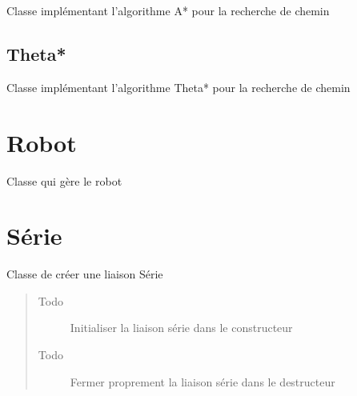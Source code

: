 \documentclass[letterpaper,10pt,french]{sphinxmanual}
\begin{document}
\begin{fulllineitems}
\label{recherche_chemin:lib.recherche_chemin.astar.Astar}
Classe implémentant l'algorithme A* pour la recherche de chemin

\end{fulllineitems}



\section{Theta*}
\label{recherche_chemin:theta}\label{recherche_chemin:module-lib.recherche_chemin.thetastar}

\begin{fulllineitems}
\label{recherche_chemin:lib.recherche_chemin.thetastar.Thetastar}
Classe implémentant l'algorithme Theta* pour la recherche de chemin

\end{fulllineitems}



\chapter{Robot}
\label{robot:module-lib.robot}\label{robot::doc}\label{robot:robot}

\begin{fulllineitems}
\label{robot:lib.robot.Robot}
Classe qui gère le robot

\end{fulllineitems}



\chapter{Série}
\label{serie:module-lib.serie}\label{serie::doc}\label{serie:serie}

\begin{fulllineitems}
\label{serie:lib.serie.Serie}
Classe de créer une liaison Série
\begin{quote}\begin{description}
\item[{Todo }] \leavevmode
Initialiser la liaison série dans le constructeur

\item[{Todo }] \leavevmode
Fermer proprement la liaison série dans le destructeur

\end{description}\end{quote}

\end{fulllineitems}
\end{document}
